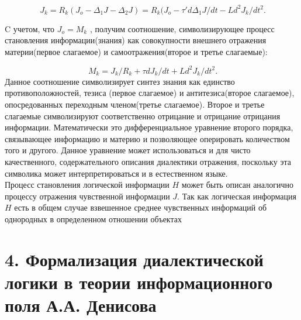 \documentclass[a4paper,12pt]{report}
\begin{document}
\begin{equation}
\label{trivial}
 \ J_k = R_k(J_o - \Delta_1 J - \Delta_2 J) = R_k(J_o - \tau' d\Delta_1J/dt - Ld^2J_k/dt^2.
\end{equation} 

C учетом, что $J_o = M_k$ , получим соотношение, символизирующее процесс становления информации(знания) как совокупности внешнего отражения материи(первое слагаемое) и самоотражения(второе и третье слагаемые):

\begin{equation}
\label{trivial}
 \ M_k = J_k/R_k + \tau dJ_k/dt + Ld^2J_k/dt^2.
\end{equation} 
 Данное соотношение символизирует синтез знания как единство противоположностей, тезиса (первое слагаемое) и антитезиса(второе слагаемое), опосредованных переходным членом(третье слагаемое). Второе и третье слагаемые символизируют соответственно отрицание и отрицание отрицания информации. Математически это дифференциальное уравнение второго порядка, связывающее информацию и материю и позволяющее оперировать количеством того и другого. Данное уравнение может использоваться и для чисто качественного, содержательного описания диалектики отражения, поскольку эта символика может интерпретироваться и в естественном языке.\\
 Процесс становления логической информации $H$ может быть описан аналогично процессу отражения чувственной информации $J$. Так как логическая информация $H$ есть в общем случае взвешенное среднее чувственных информаций об однородных в определенном отношении объектах  
 
 \chapter*{4. Формализация диалектической логики в теории информационного поля А.А. Денисова }
  \\
 
\end{document}
